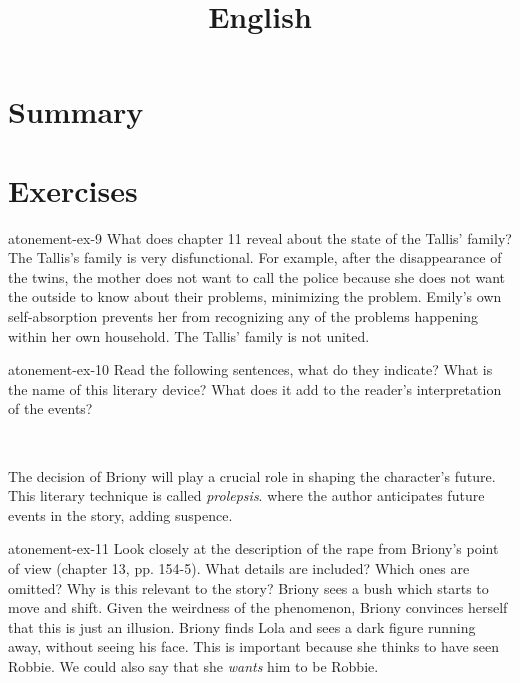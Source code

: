 \documentclass[preview]{standalone}
\begin{document}
\title{English}
\genpage

\section{Summary}

\section{Exercises}

\begin{snippetexercise}{atonement-ex-9}%
    {What does chapter 11 reveal about the state of the Tallis' family?}
    The Tallis's family is very disfunctional.
    For example, after the disappearance of the twins,
    the mother does not want to call the police because she does not want
    the outside to know about their problems, minimizing the problem.
    Emily's own self-absorption prevents her from recognizing any of the problems
    happening within her own household. The Tallis' family is not united.
\end{snippetexercise}

\begin{snippetexercise}{atonement-ex-10}%
    {Read the following sentences, what do they indicate?
    What is the name of this literary device? What does
    it add to the reader's interpretation of the events?}
    \begin{center}
         \\
    \end{center}
    The decision of Briony will play a crucial role in shaping the character's future.
    This literary technique is called \textit{prolepsis}.
    where the author anticipates future events in the story, adding suspence.
\end{snippetexercise}

\begin{snippetexercise}{atonement-ex-11}%
    {Look closely at the description of the rape from Briony's point of view (chapter 13, pp. 154-5).
    What details are included? Which ones are omitted? Why is this relevant to the story?}
    Briony sees a bush which starts to move and shift. Given the weirdness of the phenomenon,
    Briony convinces herself that this is just an illusion.
    Briony finds Lola and sees a dark figure running away, without seeing his face.
    This is important because she thinks to have seen Robbie.
    We could also say that she \textit{wants} him to be Robbie.
\end{snippetexercise}
\end{document}
